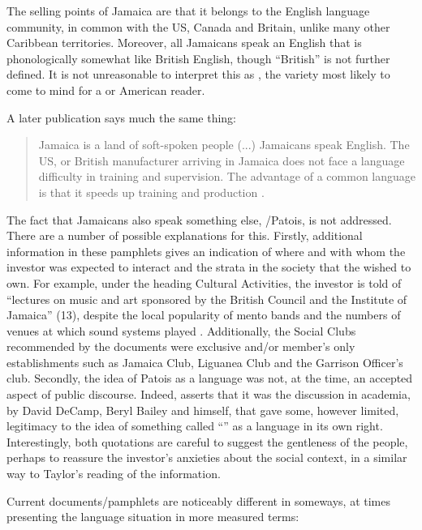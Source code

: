 The selling points of Jamaica are that it belongs to the English language community, in common with the US, Canada and Britain, unlike many other Caribbean territories.  Moreover, all Jamaicans speak an English that is phonologically somewhat like British English, though “British” is not further defined.  It is not unreasonable to interpret this as , the variety most likely to come to mind for a  or American reader.

A later publication says much the same thing:

\begin{quote}
	Jamaica is a land of soft-spoken people (...) Jamaicans speak English.  The US,  or British manufacturer arriving in Jamaica does not face a language difficulty in training and supervision. The advantage of a common language is that it speeds up training and production \citep[2--8]{JIDC1961}.
\end{quote}

The fact that Jamaicans also speak something else, \slash Patois, is not addressed.  There are a number of possible explanations for this.  Firstly, additional information in these pamphlets gives an indication of where and with whom the investor was expected to interact and the strata in the society that the  wished to own.  For example, under the heading Cultural Activities, the investor is told of “lectures on music and art sponsored by the British Council and the Institute of Jamaica” (13), despite the local popularity of mento bands and the numbers of venues at which sound systems played \citep[7--13]{Barrow1997}.  Additionally, the Social Clubs recommended by the documents were exclusive and\slash or member’s only establishments such as Jamaica Club, Liguanea Club and the Garrison Officer’s club.  Secondly, the idea of Patois as a language was not, at the time, an accepted aspect of public discourse.  Indeed, \citet{LePage1988} asserts that it was the discussion in academia, by David DeCamp, Beryl Bailey and himself, that gave some, however limited, legitimacy to the idea of something called “” as a language in its own right.  Interestingly, both quotations are careful to suggest the gentleness of the people, perhaps to reassure the investor’s anxieties about the social context, in a similar way to Taylor’s reading of the  information. 

Current  documents\slash pamphlets are noticeably different in some\linebreak ways, at times presenting the language situation in more measured terms:

